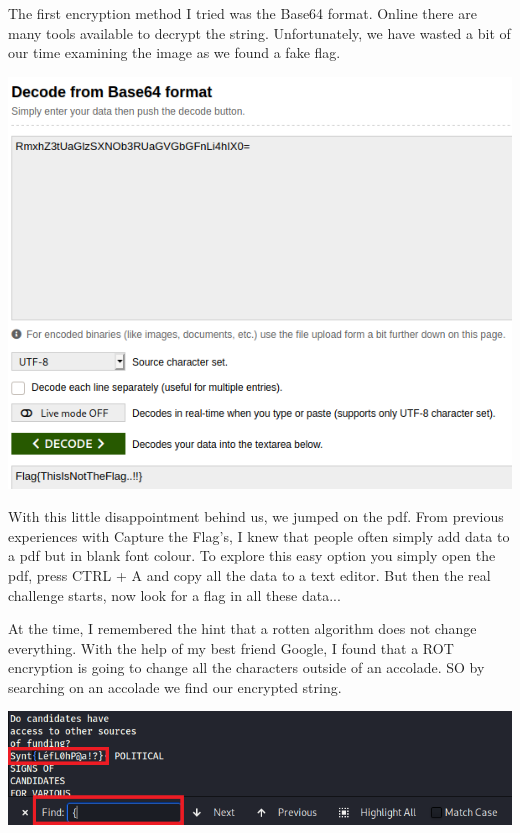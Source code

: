 \documentclass[../main.tex]{subfiles}
\begin{document}
\pagebreak
The first encryption method I tried was the Base64 format. Online there are many tools available to decrypt the string. Unfortunately, we have wasted a bit of our time examining the image as we found a fake flag. 
 \begin{center}
    \includegraphics[width=0.5\linewidth]{images/Robbe/sniffer_writeup7.png}
\end{center}

With this little disappointment behind us, we jumped on the pdf. From previous experiences with Capture the Flag's, I knew that people often simply add data to a pdf but in blank font colour. To explore this easy option you simply open the pdf, press CTRL + A and copy all the data to a text editor. But then the real challenge starts, now look for a flag in all these data... 

At the time, I remembered the hint that a rotten algorithm does not change everything. With the help of my best friend Google, I found that a ROT encryption is going to change all the characters outside of an accolade. SO by searching on an accolade we find our encrypted string. 
 \begin{center}
    \includegraphics[width=1\linewidth]{images/Robbe/sniffer_writeup4.png}
\end{center}
\end{document}
